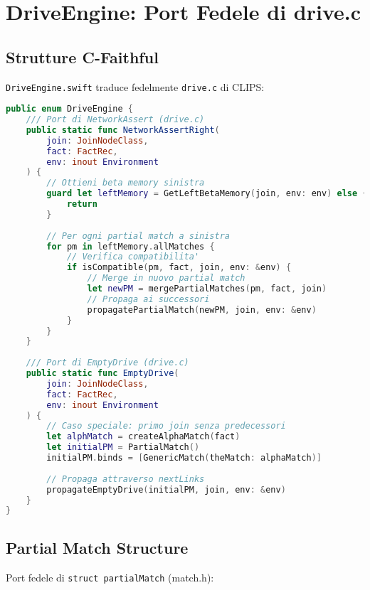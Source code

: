 \section{DriveEngine: Port Fedele di drive.c}

\subsection{Strutture C-Faithful}

\texttt{DriveEngine.swift} traduce fedelmente \texttt{drive.c} di CLIPS:

\begin{lstlisting}[language=Swift]
public enum DriveEngine {
    /// Port di NetworkAssert (drive.c)
    public static func NetworkAssertRight(
        join: JoinNodeClass,
        fact: FactRec,
        env: inout Environment
    ) {
        // Ottieni beta memory sinistra
        guard let leftMemory = GetLeftBetaMemory(join, env: env) else {
            return
        }
        
        // Per ogni partial match a sinistra
        for pm in leftMemory.allMatches {
            // Verifica compatibilita'
            if isCompatible(pm, fact, join, env: &env) {
                // Merge in nuovo partial match
                let newPM = mergePartialMatches(pm, fact, join)
                // Propaga ai successori
                propagatePartialMatch(newPM, join, env: &env)
            }
        }
    }
    
    /// Port di EmptyDrive (drive.c)
    public static func EmptyDrive(
        join: JoinNodeClass,
        fact: FactRec,
        env: inout Environment
    ) {
        // Caso speciale: primo join senza predecessori
        let alphMatch = createAlphaMatch(fact)
        let initialPM = PartialMatch()
        initialPM.binds = [GenericMatch(theMatch: alphaMatch)]
        
        // Propaga attraverso nextLinks
        propagateEmptyDrive(initialPM, join, env: &env)
    }
}
\end{lstlisting}

\subsection{Partial Match Structure}

Port fedele di \texttt{struct partialMatch} (match.h):

